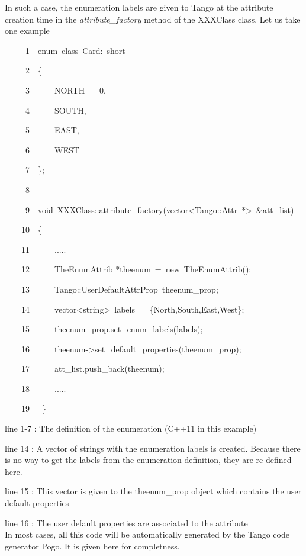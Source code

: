 In such a case, the enumeration labels are given to Tango at the attribute
creation time in the \emph{attribute\_factory} method of the XXXClass
class. Let us take one example


\begin{lyxcode}
~~~~~1~~enum~class~Card:~short

~~~~~2~~\{

~~~~~3~~~~~~NORTH~=~0,

~~~~~4~~~~~~SOUTH,

~~~~~5~~~~~~EAST,

~~~~~6~~~~~~WEST

~~~~~7~~\};

~~~~~8~

~~~~~9~~void~XXXClass::attribute\_factory(vector<Tango::Attr~{*}>~\&att\_list)

~~~~10~~\{

~~~~11~~~~~~.....

~~~~12~~~~~~TheEnumAttrib	{*}theenum~=~new~TheEnumAttrib();

~~~~13~~~~~~Tango::UserDefaultAttrProp~theenum\_prop;

~~~~14~~~~~~vector<string>~labels~=~\{\textquotedbl{}North\textquotedbl{},\textquotedbl{}South\textquotedbl{},\textquotedbl{}East\textquotedbl{},\textquotedbl{}West\textquotedbl{}\};

~~~~15~~~~~~theenum\_prop.set\_enum\_labels(labels);

~~~~16~~~~~~theenum->set\_default\_properties(theenum\_prop);

~~~~17~~~~~~att\_list.push\_back(theenum);

~~~~18~~~~~~.....

~~~~19~~~\}	
\end{lyxcode}


line 1-7 : The definition of the enumeration (C++11 in this example)

line 14 : A vector of strings with the enumeration labels is created.
Because there is no way to get the labels from the enumeration definition,
they are re-defined here.

line 15 : This vector is given to the theenum\_prop object which contains
the user default properties

line 16 : The user default properties are associated to the attribute\\


In most cases, all this code will be automatically generated by the
Tango code generator Pogo. It is given here for completness.


